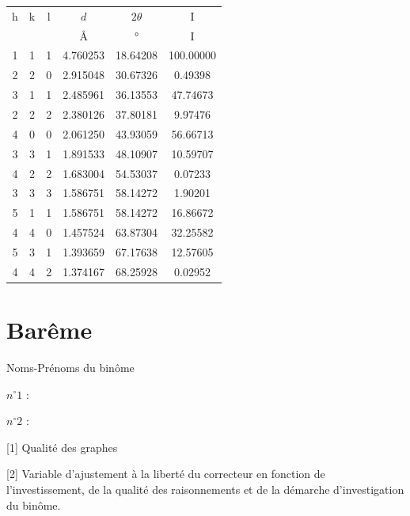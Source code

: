 \documentclass[twoside,a4paper,11pt,addpoints,answers]{exam}%
\newcounter{foo} %
\begin{document}
\begin{center}
\begin{tabular}{cccccc}
\toprule
h & k &  l &  $d$   &  $2 \theta$ & I \\
& & & \si{\angstrom} &  \si{\degree} & I \\
\midrule
1 & 1 & 1 & 4.760253 & 18.64208 &  100.00000 \\
2 & 2 & 0 & 2.915048 & 30.67326 &    0.49398 \\
3 & 1 & 1 & 2.485961 & 36.13553 &   47.74673 \\
2 & 2 & 2 & 2.380126 & 37.80181 &    9.97476 \\
4 & 0 & 0 & 2.061250 & 43.93059 &   56.66713 \\
3 & 3 & 1 & 1.891533 & 48.10907 &   10.59707 \\
4 & 2 & 2 & 1.683004 & 54.53037 &    0.07233 \\
3 & 3 & 3 & 1.586751 & 58.14272 &    1.90201 \\
5 & 1 & 1 & 1.586751 & 58.14272 &   16.86672 \\
4 & 4 & 0 & 1.457524 & 63.87304 &   32.25582 \\
5 & 3 & 1 & 1.393659 & 67.17638 &   12.57605 \\
4 & 4 & 2 & 1.374167 & 68.25928 &    0.02952 \\
\bottomrule
\end{tabular}
\end{center}

\newpage

\section*{Barême}

\begin{minipage}{0.33\textwidth}
Noms-Prénoms du binôme
\end{minipage}\begin{minipage}{0.33\textwidth}
$n^\circ 1$ :
\end{minipage}\begin{minipage}{0.33\textwidth}
$n^\circ 2$ :
\end{minipage}

\begin{questions}
\setcounter{question}{\thefoo}

[1] Qualité des graphes

[2] Variable d'ajustement à la liberté du correcteur en fonction de l'investissement, de la qualité des raisonnements et de la démarche d'investigation du binôme.

\end{questions}

\begin{center}
\gradetable
\end{center}
\end{document}
